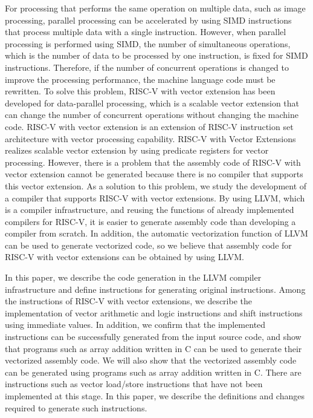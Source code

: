 For processing that performs the same operation on multiple data, such as image processing, parallel processing can be accelerated by using SIMD instructions that process multiple data with a single instruction.
However, when parallel processing is performed using SIMD, the number of simultaneous operations, which is the number of data to be processed by one instruction, is fixed for SIMD instructions. Therefore, if the number of concurrent operations is changed to improve the processing performance, the machine language code must be rewritten.
To solve this problem, RISC-V with vector extension has been developed for data-parallel processing, which is a scalable vector extension that can change the number of concurrent operations without changing the machine code. RISC-V with vector extension is an extension of RISC-V instruction set architecture with vector processing capability. RISC-V with Vector Extensions realizes scalable vector extension by using predicate registers for vector processing.
However, there is a problem that the assembly code of RISC-V with vector extension cannot be generated because there is no compiler that supports this vector extension. As a solution to this problem, we study the development of a compiler that supports RISC-V with vector extensions. By using LLVM, which is a compiler infrastructure, and reusing the functions of already implemented compilers for RISC-V, it is easier to generate assembly code than developing a compiler from scratch. In addition, the automatic vectorization function of LLVM can be used to generate vectorized code, so we believe that assembly code for RISC-V with vector extensions can be obtained by using LLVM.

In this paper, we describe the code generation in the LLVM compiler infrastructure and define instructions for generating original instructions. Among the instructions of RISC-V with vector extensions, we describe the implementation of vector arithmetic and logic instructions and shift instructions using immediate values.
In addition, we confirm that the implemented instructions can be successfully generated from the input source code, and show that programs such as array addition written in C can be used to generate their vectorized assembly code.
We will also show that the vectorized assembly code can be generated using programs such as array addition written in C. There are instructions such as vector load/store instructions that have not been implemented at this stage. In this paper, we describe the definitions and changes required to generate such instructions.